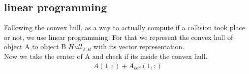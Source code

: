 \subsection{linear programming} %
Following the convex hull, as a way to actually compute if a collision took place or not, we use linear programming.
For that we represent the convex hull of object A to object B $Hull_{A.B}$ with its vector representation.\\
Now we take the center of A and check if its inside the convex hull.
\begin{align*}
A(1,:) + A_{vec}(1,:) 
\end{align*}
